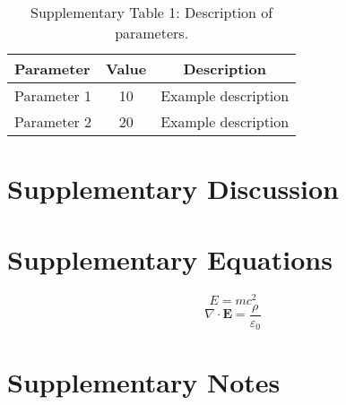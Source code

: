 \documentclass[12pt]{article}
\begin{document}
\begin{table}[H]
\centering
\caption{Supplementary Table 1: Description of parameters.}
\begin{tabular}{lcc}
\hline
Parameter & Value & Description \\
\hline
Parameter 1 & 10 & Example description \\
Parameter 2 & 20 & Example description \\
\hline
\end{tabular}
\end{table}

\section*{Supplementary Discussion}
\label{sec:supp-discussion}
\lipsum[2] %

\section*{Supplementary Equations}
\label{sec:supp-equations}
\begin{equation}
E = mc^2
\end{equation}
\begin{equation}
\nabla \cdot \mathbf{E} = \frac{\rho}{\varepsilon_0}
\end{equation}

\section*{Supplementary Notes}
\label{sec:supp-notes}
\lipsum[3] %
\end{document}
